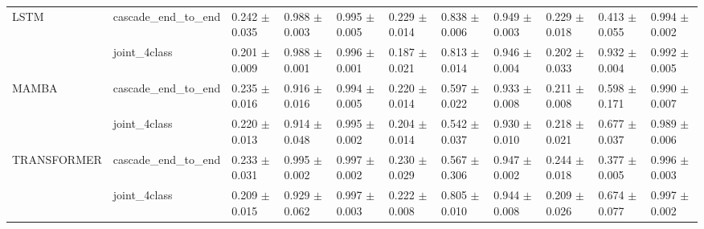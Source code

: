 \begin{table}
\begin{tabular}{lllllllllll}
LSTM & cascade_end_to_end &  0.242 $\pm$ 0.035 &  0.988 $\pm$ 0.003 &          0.995 $\pm$ 0.005 &  0.229 $\pm$ 0.014 &  0.838 $\pm$ 0.006 &          0.949 $\pm$ 0.003 &  0.229 $\pm$ 0.018 &  0.413 $\pm$ 0.055 &          0.994 $\pm$ 0.002 \\
            & joint_4class &  0.201 $\pm$ 0.009 &  0.988 $\pm$ 0.001 &          0.996 $\pm$ 0.001 &  0.187 $\pm$ 0.021 &  0.813 $\pm$ 0.014 &          0.946 $\pm$ 0.004 &  0.202 $\pm$ 0.033 &  0.932 $\pm$ 0.004 &          0.992 $\pm$ 0.005 \\
MAMBA & cascade_end_to_end &  0.235 $\pm$ 0.016 &  0.916 $\pm$ 0.016 &          0.994 $\pm$ 0.005 &  0.220 $\pm$ 0.014 &  0.597 $\pm$ 0.022 &          0.933 $\pm$ 0.008 &  0.211 $\pm$ 0.008 &  0.598 $\pm$ 0.171 &          0.990 $\pm$ 0.007 \\
            & joint_4class &  0.220 $\pm$ 0.013 &  0.914 $\pm$ 0.048 &          0.995 $\pm$ 0.002 &  0.204 $\pm$ 0.014 &  0.542 $\pm$ 0.037 &          0.930 $\pm$ 0.010 &  0.218 $\pm$ 0.021 &  0.677 $\pm$ 0.037 &          0.989 $\pm$ 0.006 \\
TRANSFORMER & cascade_end_to_end &  0.233 $\pm$ 0.031 &  0.995 $\pm$ 0.002 &          0.997 $\pm$ 0.002 &  0.230 $\pm$ 0.029 &  0.567 $\pm$ 0.306 &          0.947 $\pm$ 0.002 &  0.244 $\pm$ 0.018 &  0.377 $\pm$ 0.005 &          0.996 $\pm$ 0.003 \\
            & joint_4class &  0.209 $\pm$ 0.015 &  0.929 $\pm$ 0.062 &          0.997 $\pm$ 0.003 &  0.222 $\pm$ 0.008 &  0.805 $\pm$ 0.010 &          0.944 $\pm$ 0.008 &  0.209 $\pm$ 0.026 &  0.674 $\pm$ 0.077 &          0.997 $\pm$ 0.002 \\
\bottomrule
\end{tabular}
\end{table}
